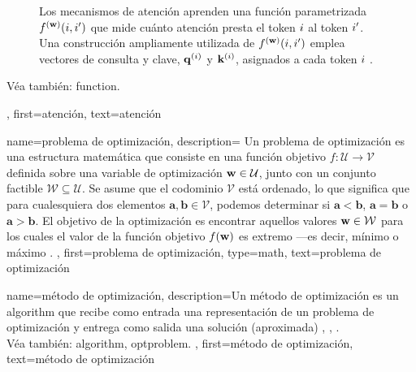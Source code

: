 {{\begin{figure}[H]
	\caption{Los mecanismos de atención aprenden una función parametrizada $f^{({\bf w})}(i,i')$ que mide 
	cuánto atención presta el token $i$ al token $i'$. Una construcción ampliamente utilizada de 
	$f^{({\bf w})}(i,i')$ emplea vectores de consulta y clave, ${\bf q}^{(i)}$ y ${\bf k}^{(i)}$, 
	asignados a cada token $i$ \cite{vaswani2017attention}.}
\end{figure}
Véa también: \gls{function}.},
first={atención},
text={atención}
}




{name={problema de optimización},
	description={
		Un problema de optimización es una estructura matemática 
		que consiste en una función objetivo $f: \mathcal{U} \rightarrow \mathcal{V}$ definida 
		sobre una variable de optimización ${\bf w} \in \mathcal{U}$, junto con un conjunto factible 
		$\mathcal{W} \subseteq \mathcal{U}$. Se asume que el codominio $\mathcal{V}$ está ordenado, 
		lo que significa que para cualesquiera dos elementos $\mathbf{a}, \mathbf{b} \in \mathcal{V}$, 
		podemos determinar si $\mathbf{a} < \mathbf{b}$, $\mathbf{a} = \mathbf{b}$ o 
		$\mathbf{a} > \mathbf{b}$. El objetivo de la optimización es encontrar aquellos valores 
		${\bf w} \in \mathcal{W}$ para los cuales el valor de la función objetivo $f({\bf w})$ 
		es extremo —es decir, mínimo o máximo \cite{BoydConvexBook,nesterov04,BertsekasNonLinProgr}.
	},
	first={problema de optimización},
	type=math,
	text={problema de optimización}
}





{name={método de optimización},
	description={Un método de optimización es un \gls{algorithm} 
		que recibe como entrada una representación de un problema de optimización y entrega como salida 
		una solución (aproximada) \cite{BoydConvexBook}, \cite{nesterov04}, \cite{BertsekasNonLinProgr}.\\
		Véa también: \gls{algorithm}, \gls{optproblem}.
	},
	first={método de optimización},
	text={método de optimización}
}


